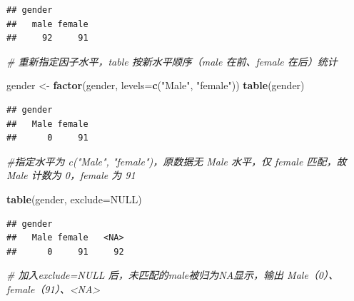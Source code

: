 \documentclass[
]{article}
\newenvironment{Shaded}{\begin{snugshade}}{\end{snugshade}}
\newcommand{\AttributeTok}[1]{\textcolor[rgb]{0.13,0.29,0.53}{#1}}
\newcommand{\CommentTok}[1]{\textcolor[rgb]{0.56,0.35,0.01}{\textit{#1}}}
\newcommand{\ConstantTok}[1]{\textcolor[rgb]{0.56,0.35,0.01}{#1}}
\newcommand{\FunctionTok}[1]{\textcolor[rgb]{0.13,0.29,0.53}{\textbf{#1}}}
\newcommand{\NormalTok}[1]{#1}
\newcommand{\OtherTok}[1]{\textcolor[rgb]{0.56,0.35,0.01}{#1}}
\newcommand{\StringTok}[1]{\textcolor[rgb]{0.31,0.60,0.02}{#1}}
\begin{document}
\begin{verbatim}
## gender
##   male female 
##     92     91
\end{verbatim}

\begin{Shaded}
\begin{Highlighting}[]
 \CommentTok{\# 重新指定因子水平，table 按新水平顺序（male 在前、female 在后）统计}
\end{Highlighting}
\end{Shaded}

\begin{Shaded}
\begin{Highlighting}[]
\NormalTok{ gender }\OtherTok{\textless{}{-}} \FunctionTok{factor}\NormalTok{(gender, }\AttributeTok{levels=}\FunctionTok{c}\NormalTok{(}\StringTok{"Male"}\NormalTok{, }\StringTok{"female"}\NormalTok{))}
 \FunctionTok{table}\NormalTok{(gender)}
\end{Highlighting}
\end{Shaded}

\begin{verbatim}
## gender
##   Male female 
##      0     91
\end{verbatim}

\begin{Shaded}
\begin{Highlighting}[]
 \CommentTok{\#指定水平为 c("Male", "female")，原数据无 Male 水平，仅 female 匹配，故 Male 计数为 0，female 为 91}
\end{Highlighting}
\end{Shaded}

\begin{Shaded}
\begin{Highlighting}[]
 \FunctionTok{table}\NormalTok{(gender, }\AttributeTok{exclude=}\ConstantTok{NULL}\NormalTok{)}
\end{Highlighting}
\end{Shaded}

\begin{verbatim}
## gender
##   Male female   <NA> 
##      0     91     92
\end{verbatim}

\begin{Shaded}
\begin{Highlighting}[]
\CommentTok{\# 加入exclude=NULL 后，未匹配的male被归为NA显示，输出 Male（0）、female（91）、\textless{}NA\textgreater{}}
\end{Highlighting}
\end{Shaded}
\end{document}
